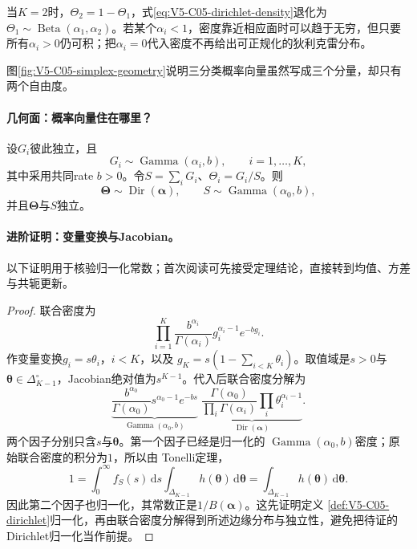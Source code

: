 当$K=2$时，$\Theta_2=1-\Theta_1$，式\eqref{eq:V5-C05-dirichlet-density}退化为
$\Theta_1\sim\operatorname{Beta}(\alpha_1,\alpha_2)$。若某个$\alpha_i<1$，密度靠近相应面时可以趋于无穷，但只要所有$\alpha_i>0$仍可积；把$\alpha_i=0$代入密度不再给出可正规化的狄利克雷分布。

图\ref{fig:V5-C05-simplex-geometry}说明三分类概率向量虽然写成三个分量，却只有两个自由度。
\paragraph{几何面：概率向量住在哪里？}


\begin{theorem}[Gamma归一化构造]\label{thm:V5-C05-gamma-normalization}
设$G_i$彼此独立，且
\[
G_i\sim\operatorname{Gamma}(\alpha_i,b),
\qquad i=1,\ldots,K,
\]
其中采用共同rate $b>0$。令$S=\sum_iG_i$、$\Theta_i=G_i/S$。则
\[
\boldsymbol\Theta\sim\operatorname{Dir}(\boldsymbol\alpha),
\qquad
S\sim\operatorname{Gamma}(\alpha_0,b),
\]
并且$\boldsymbol\Theta$与$S$独立。
\end{theorem}
\paragraph{进阶证明：变量变换与Jacobian。}
以下证明用于核验归一化常数；首次阅读可先接受定理结论，直接转到均值、方差与共轭更新。
\begin{proof}
联合密度为
\[
\prod_{i=1}^K
\frac{b^{\alpha_i}}{\Gamma(\alpha_i)}
g_i^{\alpha_i-1}e^{-bg_i}.
\]
作变量变换$g_i=s\theta_i$，$i<K$，以及
$g_K=s(1-\sum_{i<K}\theta_i)$。取值域是$s>0$与
$\boldsymbol\theta\in\Delta_{K-1}^{\circ}$，Jacobian绝对值为$s^{K-1}$。代入后联合密度分解为
\[
\underbrace{\frac{b^{\alpha_0}}{\Gamma(\alpha_0)}
s^{\alpha_0-1}e^{-bs}}_{\operatorname{Gamma}(\alpha_0,b)}
\;
\underbrace{\frac{\Gamma(\alpha_0)}
{\prod_i\Gamma(\alpha_i)}
\prod_i\theta_i^{\alpha_i-1}}_{\operatorname{Dir}(\boldsymbol\alpha)}.
\]
两个因子分别只含$s$与$\boldsymbol\theta$。第一个因子已经是归一化的
$\operatorname{Gamma}(\alpha_0,b)$密度；原始联合密度的积分为$1$，所以由
Tonelli定理，
\[
1=\int_0^\infty f_S(s)\,\mathrm ds
\int_{\Delta_{K-1}}h(\boldsymbol\theta)\,\mathrm d\boldsymbol\theta
=\int_{\Delta_{K-1}}h(\boldsymbol\theta)\,\mathrm d\boldsymbol\theta.
\]
因此第二个因子也归一化，其常数正是$1/B(\boldsymbol\alpha)$。这先证明定义
\ref{def:V5-C05-dirichlet}归一化，再由联合密度分解得到所述边缘分布与独立性，避免把待证的Dirichlet归一化当作前提。
\end{proof}

